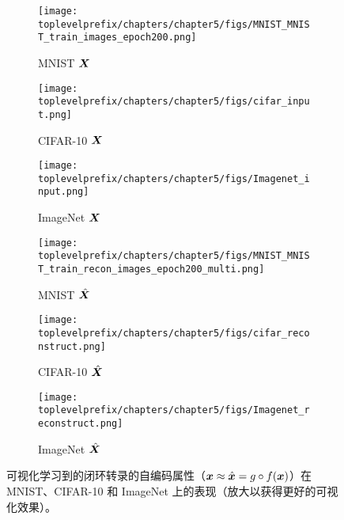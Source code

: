 \documentclass[../../book-main_zh.tex]{subfiles}
\begin{document}

\begin{figure}[t]
    \begin{subfigure}[t]{0.3\textwidth}
        \centering
        \texttt{[image: \\toplevelprefix/chapters/chapter5/figs/MNIST\_MNIST\_train\_images\_epoch200.png]}
        \caption{{\small MNIST $\bm{X}$}}
    \end{subfigure}
    \hfill
    \begin{subfigure}[t]{0.3\textwidth}
        \centering
        \texttt{[image: \\toplevelprefix/chapters/chapter5/figs/cifar\_input.png]}
        \caption{{\small CIFAR-10 $\bm{X}$}}
    \end{subfigure}
    \hfill
    \begin{subfigure}[t]{0.3\textwidth}
        \centering
        \texttt{[image: \\toplevelprefix/chapters/chapter5/figs/Imagenet\_input.png]}
        \caption{{\small ImageNet $\bm{X}$}}
    \end{subfigure}

    \begin{subfigure}[t]{0.3\textwidth}
        \centering
        \texttt{[image: \\toplevelprefix/chapters/chapter5/figs/MNIST\_MNIST\_train\_recon\_images\_epoch200\_multi.png]}
        \caption{{\small MNIST $\hat{\bm{X}}$}}
    \end{subfigure}
    \hfill
    \begin{subfigure}[t]{0.3\textwidth}
        \centering
        \texttt{[image: \\toplevelprefix/chapters/chapter5/figs/cifar\_reconstruct.png]}
        \caption{{\small CIFAR-10 $\hat{\bm{X}}$}}
    \end{subfigure}
    \hfill
    \begin{subfigure}[t]{0.3\textwidth}
        \centering
        \texttt{[image: \\toplevelprefix/chapters/chapter5/figs/Imagenet\_reconstruct.png]}
        \caption{{\small ImageNet $\hat{\bm{X}}$}}
    \end{subfigure}
    \caption{可视化学习到的闭环转录的自编码属性（$\bm{x} \approx \hat{\bm{x}} = g\circ f(\bm{x})$）在 MNIST、CIFAR-10 和 ImageNet 上的表现（放大以获得更好的可视化效果）。}
    \label{fig:justifyx=x}
\end{figure}
     
\end{document}
